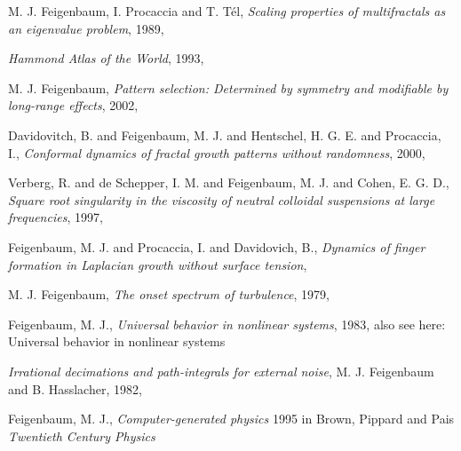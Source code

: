 {M. J. Feigenbaum, I. Procaccia and T. T{\'e}l},
  {\em Scaling properties of multifractals as an eigenvalue problem},
{1989},

{\em Hammond Atlas of the World},
{1993},

{M. J. Feigenbaum},
{\em Pattern selection: {Determined} by symmetry and modifiable by long-range effects},
{2002},

{Davidovitch, B. and Feigenbaum, M. J. and Hentschel, H. G. E. and Procaccia, I.},
  {\em Conformal dynamics of fractal growth patterns without randomness},
{2000},

{Verberg, R. and de Schepper, I. M. and Feigenbaum, M. J. and Cohen, E. G. D.},
  {\em Square root singularity in the viscosity of neutral colloidal suspensions at large frequencies},
{1997},

{Feigenbaum, M. J. and Procaccia, I. and Davidovich, B.},
  {\em Dynamics of finger formation in {Laplacian} growth without surface tension},

{M. J. Feigenbaum},
{\em The onset spectrum of turbulence},
{1979},

{Feigenbaum, M. J.},
{\em Universal behavior in nonlinear systems},
{1983},
also see here:
{Universal behavior in nonlinear systems}

{\em Irrational decimations and path-integrals for external noise},
{M. J. Feigenbaum and B. Hasslacher},
{1982},

{Feigenbaum, M. J.},
{\em Computer-generated physics}
1995 in {Brown, Pippard  and Pais}
{\em {Twentieth Century Physics}}

